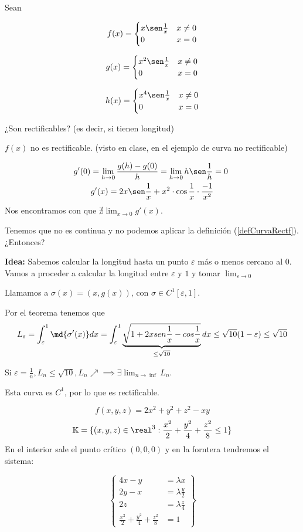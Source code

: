 \begin{problem}[3]
Sean

\ppart
\[f(x) = \begin{cases}
x \sen \frac{1}{x} & x\neq 0\\
0 & x=0 
\end{cases}\]

\ppart
\[g(x) = \begin{cases}
x^2 \sen\frac{1}{x} & x\neq 0\\
0 & x=0 
\end{cases} \]

\ppart
\[h(x) =  \begin{cases}
x^4 \sen\frac{1}{x} & x\neq 0\\
0 & x=0 
\end{cases} \]

¿Son rectificables? (es decir, si tienen longitud)
\solution

\spart $f(x)$ no es rectificable. (visto en clase, en el ejemplo de curva no rectificable)

\spart 
\begin{gather*}
g'(0) = \lim_{h\to 0} \frac{g(h)-g(0)}{h} = \lim_{h\to 0} h \sen\frac{1}{h} = 0 \\
g'(x) = 2x\sen\frac{1}{x} + x^2\cdot\cos\frac{1}{x}\cdot\frac{-1}{x^2}
\end{gather*}
Nos encontramos con que $\nexists \lim_{x\to 0} g'(x)$. 

Tenemos que no es continua y no podemos aplicar la definición (\ref{defCurvaRectf}). ¿Entonces?

\textbf{Idea:} Sabemos calcular la longitud hasta un punto $\varepsilon$ más o menos cercano al $0$. Vamos a proceder a calcular la longitud entre $\varepsilon$ y $1$ y tomar $\lim_{\varepsilon \to 0}$

Llamamos a $\sigma(x) = (x,g(x))$, con $\sigma \in C^1[\varepsilon,1]$.

Por el teorema tenemos que \[L_{\varepsilon} = \int_{\varepsilon}^1 \md{\sigma'(x)}dx = \int_{\varepsilon}^1 \underbrace{\sqrt{1+2xsen\frac{1}{x} - cos\frac{1}{x}}}_{\leq \sqrt{10}}dx \leq \sqrt{10}(1-\varepsilon) \leq \sqrt{10}\]

Si $\varepsilon = \frac{1}{n}, L_n \leq \sqrt{10}, L_n \nearrow \implies \exists \lim_{n\to\inf} L_n$.

\spart Esta curva es $C^1$, por lo que es rectificable.

\end{problem}


\begin{problem}[15.b]
\[f(x,y,z) = 2x^2+y^2+z^2-xy\]
\[\mathbb{K} = \{ (x,y,z)\in \real^3 : \frac{x^2}{2} + \frac{y^2}{4} + \frac{z^2}{8} \leq 1\}\]
\solution
En el interior sale el punto crítico $(0,0,0)$ y en la forntera tendremos el sistema:

\[\left\{\begin{array}{cc}
4x-y&=\lambda x\\
2y-x &=\lambda \frac{y}{2}\\
2z &= \lambda\frac{z}{4}\\
\frac{x^2}{2}+\frac{y^2}{4} + \frac{z^2}{8} &=1
\end{array}\right\}\]
\end{problem}


